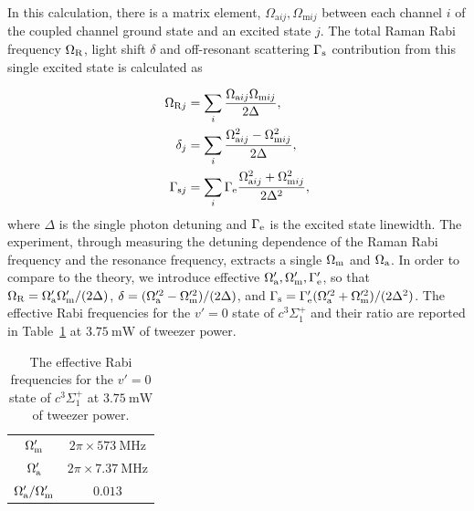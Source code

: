 \documentclass[aps,prx,secnumarabic,amsmath,amssymb,10pt,superscriptaddress]{revtex4-2}
\begin{document}
In this calculation, there is a matrix element, $\Omega_{\mathrm{a}ij}, \Omega_{\mathrm{m}ij}$ between each channel $ i $ of the coupled channel ground state and an excited state $ j $. The total Raman Rabi frequency $ \Omega_{\rm R}$, light shift $ \delta$ and off-resonant scattering $ \Gamma_{\rm s} $ contribution from this single excited state is calculated as

\begin{align}
  \Omega_{\mathrm{R}j} &= \displaystyle\sum_{i} \frac{\Omega_{\mathrm{a}ij} \Omega_{\mathrm{m}ij}}{2\Delta}, \\
  \delta_j &= \displaystyle\sum_{i} \frac{\Omega_{\mathrm{a}ij}^2 - \Omega_{\mathrm{m}ij}^2}{2\Delta}, \\
  \Gamma_{\mathrm{s} j} &= \displaystyle\sum_{i} \Gamma_{\rm e} \frac{\Omega_{\mathrm{a}ij}^2 + \Omega_{\mathrm{m}ij}^2}{2\Delta^2},
\end{align}
where $ \Delta $ is the single photon detuning and $ \Gamma_{\rm e} $ is the excited state linewidth. The experiment, through measuring the detuning dependence of the Raman Rabi frequency and the resonance frequency, extracts a single $ \Omega_{\rm m} $ and $ \Omega_{\rm a} $. In order to compare to the theory, we introduce effective $ \Omega_{\rm a}', \Omega_{\rm m}', \Gamma_{\rm e}'$, so that $ \Omega_{\rm R} = \Omega_{\rm a}'\Omega_{\rm m}'/(2\Delta) $, $\delta = (\Omega_{\rm a}'^2 - \Omega_{\rm m}'^2)/(2\Delta) $, and $\Gamma_{\rm s} = \Gamma_{\rm e}'(\Omega_{\rm a}'^2 + \Omega_{\rm m}'^2)/(2\Delta^2) $. The effective Rabi frequencies for the $v' = 0$ state of $ c^3\Sigma^+_1$ and their ratio are reported in Table~\ref{tab:sm} at $3.75~\mathrm{mW}$ of tweezer power.


\begin{table}[ht]
  \centering
  \begin{tabular}{|c|c|} \hline
    $\Omega_{\rm m}'$ &  $2\pi \times 573 ~\mathrm{MHz}$ \\
    $\Omega_{\rm a}'$ &  $2\pi \times 7.37 ~\mathrm{MHz}$ \\
    $\Omega_{\rm a}'/\Omega_{\rm m}'$ & $ 0.013 $ \\ \hline
  \end{tabular}
  \caption{ The effective Rabi frequencies for the $v' = 0$ state of $c^3\Sigma^+_1$ at $ 3.75~\mathrm{mW}$ of tweezer power.
    \label{tab:sm}}
\end{table}
\end{document}
